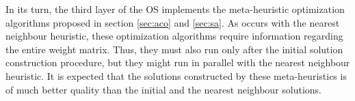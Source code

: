 In its turn, the third layer of the OS implements the meta-heuristic optimization algorithms proposed in section \ref{sec:aco} and \ref{sec:sa}. As occurs with the nearest neighbour heuristic, these optimization algorithms require information regarding the entire weight matrix. Thus, they must also run only after the initial solution construction procedure, but they might run in parallel with the nearest neighbour heuristic. It is expected that the solutions constructed by these meta-heuristics is of much better quality than the initial and the nearest neighbour solutions.


